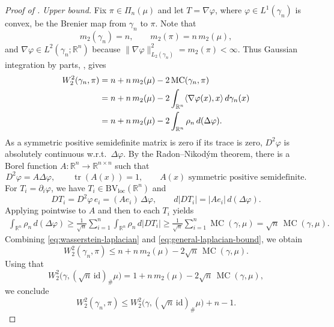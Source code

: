 \documentclass[11pt]{amsart}
\theoremstyle{definition}
\newcommand{\R}{\mathbb{R}}
\newcommand{\tr}{\operatorname{tr}}
\newcommand{\W}{W}
\newcommand{\mtwo}{m_2}
\newcommand{\MC}{\operatorname{MC}}
\newcommand{\BVloc}{\operatorname{BV_{loc}}}
\begin{document}
\begin{proof}[Proof of ]
\emph{Upper bound.}
Fix $\pi\in\Pi_n(\mu)$ and let $T=\nabla\varphi$, where $\varphi \in L^1(\gamma_n)$ is convex, be the Brenier map
from $\gamma_n$ to $\pi$. Note that 
\[
  \mtwo(\gamma_n)=n,
  \qquad
  \mtwo(\pi)=n\,\mtwo(\mu),
\]
and $\nabla\varphi\in L^2(\gamma_n;\R^n)$ because $\| \nabla\varphi\|^2_{L_2(\gamma_n)} =   \mtwo(\pi) < \infty$. Thus Gaussian
integration by parts, , gives
\begin{align}\label{eq:wasserstein-laplacian}
  \W_2^2(\gamma_n,\pi)
  &=
  n+n\,\mtwo(\mu)
  -2\MC(\gamma_n,\pi) \notag\\
  &=
  n+n\,\mtwo(\mu)
  -2\int_{\R^n} \langle \nabla\varphi(x),x \rangle \, d\gamma_n(x) \notag \\
  &=
  n+n\,\mtwo(\mu)
  -2\int_{\R^n}\rho_n\,d(\Delta\varphi).
\end{align}
As a symmetric positive semidefinite matrix is zero if its trace is zero, $D^2\varphi$ is absolutely continuous w.r.t.\ $\Delta\varphi$. By the Radon--Nikodým theorem, there is a Borel function $A : \R^n \to \R^{n \times n}$ such that
\[
D^2 \varphi = A \Delta \varphi, \qquad \tr(A(x))=1, \qquad A(x) \text{ symmetric positive semidefinite}.
\]
For $T_i=\partial_i\varphi$, we have $T_i\in \BVloc(\R^n)$
and
\[
  D T_i=D^2\varphi\,e_i=(Ae_i)\,\Delta\varphi,
  \qquad
  d|D T_i|=|Ae_i|\,d(\Delta\varphi).
\]
Applying  pointwise to $A$ and then
 to each $T_i$ yields
\begin{align}\label{eq:general-laplacian-bound}
  \int_{\R^n}\rho_n\,d(\Delta\varphi)
  \geq
  \frac1{\sqrt n}\sum_{i=1}^n
  \int_{\R^n}\rho_n\,d|D T_i| 
  \geq
  \frac1{\sqrt n}\sum_{i=1}^n\MC(\gamma,\mu)
  =
  \sqrt n\,\MC(\gamma,\mu).
\end{align}
Combining \eqref{eq:wasserstein-laplacian} and
\eqref{eq:general-laplacian-bound}, we obtain
\[
  \W_2^2(\gamma_n,\pi)
  \leq
  n+n\,\mtwo(\mu)-2\sqrt n\,\MC(\gamma,\mu).
\]
Using that 
\[
  \W_2^2\bigl(\gamma,(\sqrt n\,\mathrm{id})_\#\mu\bigr)
  =
  1+n\,\mtwo(\mu)-2\sqrt n\,\MC(\gamma,\mu),
\]
we conclude 
\[
\W_2^2(\gamma_n,\pi) 
  \leq \W_2^2\bigl(\gamma,(\sqrt n\,\mathrm{id})_\#\mu\bigr) + n-1.
\]

\medskip


\end{proof}
\end{document}
